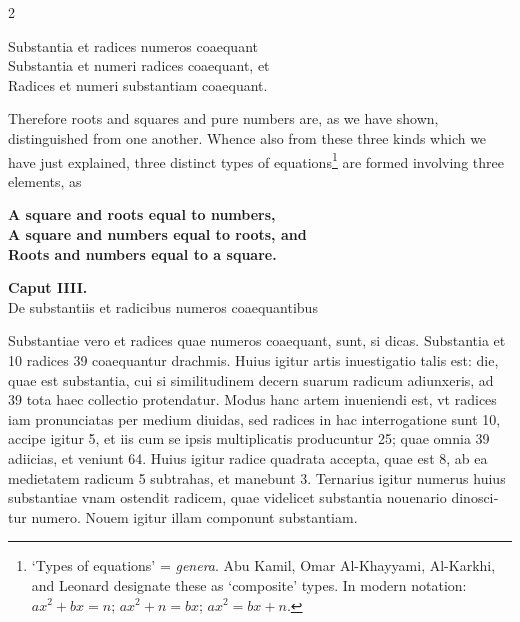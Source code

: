 \documentclass[11pt,a4paper,twoside]{book}
\newcommand{\latincolumn}[1]{\textlatin{\small #1}}
\newcommand{\englishcolumn}[1]{\small #1}
\begin{document}
\begin{paracol}{2}
\begin{center}
\latincolumn{Substantia et radices numeros coaequant}\\
\latincolumn{Substantia et numeri radices coaequant, et}\\
\latincolumn{Radices et numeri substantiam coaequant.}
\end{center}

\switchcolumn

\englishcolumn{Therefore roots and squares and pure numbers are, as we have shown, distinguished from one another. Whence also from these three kinds which we have just explained, three distinct types of equations\footnote{`Types of equations' = \textit{genera}. Abu Kamil, Omar Al-Khayyami, Al-Karkhi, and Leonard designate these as `composite' types. In modern notation: $ax^2 + bx = n$; $ax^2 + n = bx$; $ax^2 = bx + n$.} are formed involving three elements, as}

\begin{center}
\textbf{A square and roots equal to numbers,}\\
\textbf{A square and numbers equal to roots, and}\\
\textbf{Roots and numbers equal to a square.}
\end{center}

\switchcolumn*

\begin{center}
{\normalsize\bfseries\color{sectioncolor} Caput IIII.}\\[0.2cm]
\latincolumn{De substantiis et radicibus numeros coaequantibus}
\end{center}

\medskip

\latincolumn{Substantiae vero et radices quae numeros coaequant, sunt, si dicas. Substantia et 10 radices 39 coaequantur drachmis. Huius igitur artis inuestigatio talis est: die, quae est substantia, cui si similitudinem decern suarum radicum adiunxeris, ad 39 tota haec collectio protendatur. Modus hanc artem inueniendi est, vt radices iam pronunciatas per medium diuidas, sed radices in hac interrogatione sunt 10, accipe igitur 5, et iis cum se ipsis multiplicatis producuntur 25; quae omnia 39 adiicias, et veniunt 64. Huius igitur radice quadrata accepta, quae est 8, ab ea medietatem radicum 5 subtrahas, et manebunt 3. Ternarius igitur numerus huius substantiae vnam ostendit radicem, quae videlicet substantia nouenario dinoscitur numero. Nouem igitur illam componunt substantiam.}


\end{paracol}
\end{document}
